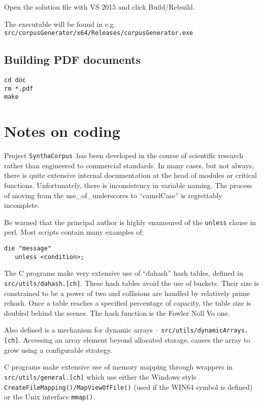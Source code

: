 \documentclass{article}
\newcommand{\projectName}{\texttt{SynthaCorpus}}
\begin{document}
Open the solution file with VS 2015 and click Build/Rebuild.

The executable will be found in
e.g. \texttt{src/corpusGenerator/x64/Releases/corpusGenerator.exe}

\subsection{Building PDF documents}

\begin{verbatim}
cd doc
rm *.pdf
make
\end{verbatim}


\section{Notes on coding}

Project \projectName~has been developed in the course of scientific
research rather than engineered to commercial standards.  In many
cases, but not always, there is quite extensive internal documentation
at the head of modules or critical functions.
Unfortunately, there is inconsistency in variable
naming. The process of moving from the use\_of\_underscores to
``camelCase'' is regrettably incomplete.

Be warned that the principal author is highly enamoured of the
\texttt{unless} clause in perl.  Most scripts contain many examples
of:
\begin{verbatim}
die "message"
   unless <condition>;
\end{verbatim}

The C programs make very extensive use of ``dahash'' hash tables,
defined in \texttt{src/utils/dahash.[ch]}.  These hash tables avoid
the use of buckets.  Their size is constrained to be a power of two
and collisions are handled by relatively prime rehash.  Once a table
reaches a specified percentage of capacity, the table size is doubled
behind the scenes.  The hash function is the Fowler Noll Vo one.

Also defined is a mechanism for dynamic arrays --
\texttt{src/utils/dynamicArrays.[ch]}.  Accessing an array element
beyond allocated storage, causes the array to grow using a
configurable strategy.

C programs make extensive use of memory mapping through wrappers in
\texttt{src/utils/general.[ch]} which use either the
Windows style \texttt{CreateFileMapping()/MapViewOfFile()} (used if the
WIN64 symbol is defined) or the Unix interface \texttt{mmap()}.
\end{document}
